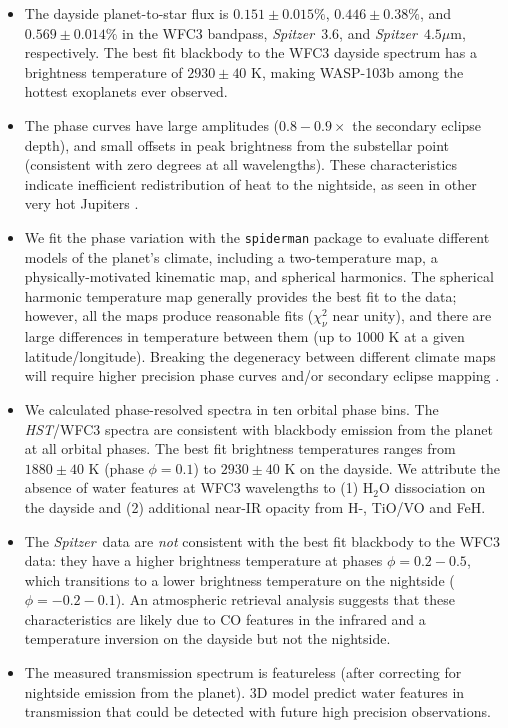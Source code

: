 \documentclass[twocolumn, trackchanges]{aastex61}
\newcommand{\project}[1]{\textsl{#1}}
\newcommand{\HST}{\project{HST}}
\newcommand{\Spitzer}{\project{Spitzer}}
\begin{document}
\begin{itemize}
	\item{The dayside planet-to-star flux is $0.151\pm0.015\%$, $0.446\pm0.38\%$, and $0.569\pm0.014\%$ in the WFC3 bandpass, \Spitzer\ $3.6$, and \Spitzer\ $4.5\mu$m, respectively.  The best fit blackbody to the WFC3 dayside spectrum has a brightness temperature of $2930 \pm 40$ K, making WASP-103b among the hottest exoplanets ever observed.}
	\item{The phase curves have large amplitudes ($0.8 -0.9\times$ the secondary eclipse depth), and small offsets in peak brightness from the substellar point (consistent with zero degrees at all wavelengths). These characteristics indicate inefficient redistribution of heat to the nightside, as seen in other very hot Jupiters \citep{komacek17}.} 
	\item{We fit the phase variation with the \texttt{spiderman} package \citep{louden17} to evaluate different models of the planet's climate, including a two-temperature map, a physically-motivated kinematic map, and spherical harmonics. The spherical harmonic temperature map generally provides the best fit to the data; however, all the maps produce reasonable fits ($\chi^2_\nu$ near unity), and there are large differences in temperature between them (up to 1000 K at a given latitude/longitude). Breaking the degeneracy between different climate maps will require higher precision phase curves and/or secondary eclipse mapping \citep[e.g.][]{dewit12}.}
\item{We calculated phase-resolved spectra in ten orbital phase bins. The \HST/WFC3 spectra are consistent with  blackbody emission from the planet at all orbital phases. The best fit brightness temperatures ranges from $1880\pm40$ K (phase $\phi = 0.1$) to $2930\pm40$ K on the dayside. We attribute the absence of water features at WFC3 wavelengths to (1) H$_2$O dissociation on the dayside and (2) additional near-IR opacity from H-, TiO/VO and FeH.}
\item{The \Spitzer\ data are \emph{not} consistent with the best fit blackbody to the WFC3 data: they have a higher brightness temperature at phases $\phi = 0.2 - 0.5$, which transitions to a lower brightness temperature on the nightside ($\phi = -0.2 - 0.1$). An atmospheric retrieval analysis suggests that these characteristics are likely due to CO features in the infrared and a temperature inversion on the dayside but not the nightside.}
\item{The measured transmission spectrum is featureless (after correcting for nightside emission from the planet). 3D model predict water features in transmission that could be detected with future high precision observations.}

\end{itemize}
\end{document}
